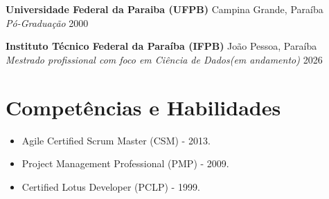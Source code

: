 \documentclass[11pt,a4paper]{article}
\begin{document}
{\bfseries Universidade Federal da Paraiba (UFPB)} \hfill Campina Grande, Paraíba \\
{\itshape Pó-Graduação} \hfill 2000

{\bfseries Instituto Técnico Federal da Paraíba (IFPB)} \hfill João Pessoa, Paraíba \\
{\itshape Mestrado profissional com foco em Ciência de Dados(em andamento)} \hfill 2026

\section{Competências e Habilidades}
\begin{itemize}[noitemsep, leftmargin=10pt]
    \item  Agile Certified Scrum Master (CSM) - 2013.
    \item  Project Management Professional (PMP) - 2009.
    \item Certified Lotus Developer (PCLP) - 1999.
\end{itemize}
\end{document}
